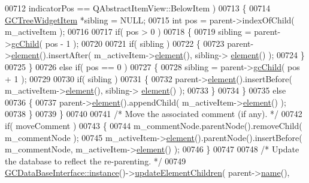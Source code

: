 \begin{DoxyCode}
00712                indicatorPos == QAbstractItemView::BelowItem )
00713       \{
00714         \hyperlink{class_g_c_tree_widget_item}{GCTreeWidgetItem} *sibling = NULL;
00715         \textcolor{keywordtype}{int} pos = parent->indexOfChild( m\_activeItem );
00716 
00717         \textcolor{keywordflow}{if}( pos > 0 )
00718         \{
00719           sibling = parent->\hyperlink{class_g_c_tree_widget_item_af44c0d2c5eaa1c5bb3a6a1aace3e8c78}{gcChild}( pos - 1 );
00720 
00721           \textcolor{keywordflow}{if}( sibling )
00722           \{
00723             parent->\hyperlink{class_g_c_tree_widget_item_a584cad866bdbd94710d31eb77b804d84}{element}().insertAfter( m\_activeItem->\hyperlink{class_g_c_tree_widget_item_a584cad866bdbd94710d31eb77b804d84}{element}(), sibling->
      \hyperlink{class_g_c_tree_widget_item_a584cad866bdbd94710d31eb77b804d84}{element}() );
00724           \}
00725         \}
00726         \textcolor{keywordflow}{else} \textcolor{keywordflow}{if}( pos == 0 )
00727         \{
00728           sibling = parent->\hyperlink{class_g_c_tree_widget_item_af44c0d2c5eaa1c5bb3a6a1aace3e8c78}{gcChild}( pos + 1 );
00729 
00730           \textcolor{keywordflow}{if}( sibling )
00731           \{
00732             parent->\hyperlink{class_g_c_tree_widget_item_a584cad866bdbd94710d31eb77b804d84}{element}().insertBefore( m\_activeItem->\hyperlink{class_g_c_tree_widget_item_a584cad866bdbd94710d31eb77b804d84}{element}(), sibling->
      \hyperlink{class_g_c_tree_widget_item_a584cad866bdbd94710d31eb77b804d84}{element}() );
00733           \}
00734         \}
00735         \textcolor{keywordflow}{else}
00736         \{
00737           parent->\hyperlink{class_g_c_tree_widget_item_a584cad866bdbd94710d31eb77b804d84}{element}().appendChild( m\_activeItem->\hyperlink{class_g_c_tree_widget_item_a584cad866bdbd94710d31eb77b804d84}{element}() );
00738         \}
00739       \}
00740 
00741       \textcolor{comment}{/* Move the associated comment (if any). */}
00742       \textcolor{keywordflow}{if}( moveComment )
00743       \{
00744         m\_commentNode.parentNode().removeChild( m\_commentNode );
00745         m\_activeItem->\hyperlink{class_g_c_tree_widget_item_a584cad866bdbd94710d31eb77b804d84}{element}().parentNode().insertBefore( m\_commentNode, 
      m\_activeItem->\hyperlink{class_g_c_tree_widget_item_a584cad866bdbd94710d31eb77b804d84}{element}() );
00746       \}
00747 
00748       \textcolor{comment}{/* Update the database to reflect the re-parenting. */}
00749       \hyperlink{class_g_c_data_base_interface_a1baea9c0667aa8b610ec30076fcab84c}{GCDataBaseInterface::instance}()->\hyperlink{class_g_c_data_base_interface_a91a60134bfb21a3f49d826340bebb852}{updateElementChildren}( parent->\hyperlink{class_g_c_tree_widget_item_a3af8c66a690cd55986a38b996a375ba4}{name}(), 

\end{DoxyCode}
